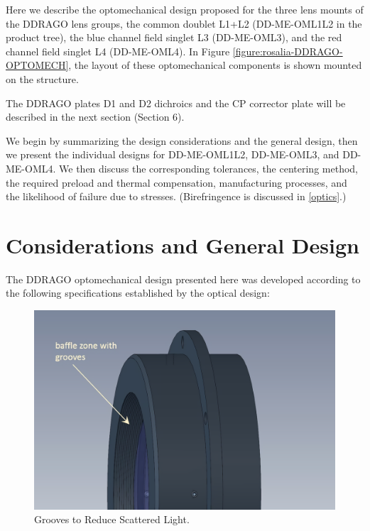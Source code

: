 \documentclass{report}
\begin{document}
Here we describe the optomechanical design proposed for the three lens mounts of the DDRAGO lens groups, the common doublet L1+L2 (DD-ME-OML1L2 in the product tree), the blue channel field singlet L3 (DD-ME-OML3), and the red channel field singlet L4 (DD-ME-OML4). In Figure \ref{figure:rosalia-DDRAGO-OPTOMECH}, the layout of these optomechanical components is shown mounted on the structure.

The DDRAGO plates D1 and D2 dichroics and the CP corrector plate will be described in the next section (Section 6).

We begin by summarizing the design considerations and the general design, then we present the individual designs for DD-ME-OML1L2, DD-ME-OML3, and DD-ME-OML4. We then discuss the corresponding tolerances, the centering method, the required preload and thermal compensation, manufacturing processes, and the likelihood of failure due to stresses. (Birefringence is discussed in \ref{optics}.)


\section{Considerations and General Design}

The DDRAGO optomechanical design presented here was developed according to the following specifications established by the optical design:

\begin{figure}
\begin{center}
\includegraphics[width=0.7\linewidth]{figures/rosalia-grooves.png}
\end{center}
\caption{Grooves to Reduce Scattered Light.}
\label{figure:rosalia-grooves}
\end{figure}
\end{document}
